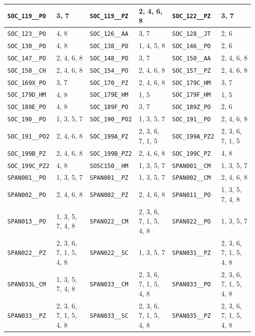 \begin{longtable}{|l|l||l|l||l|l|}
    \verb|SOC_119__PO| & 3, 7 & \verb|SOC_119__PZ| & 2, 4, 6, 8 & \verb|SOC_122__PZ| & 3, 7\\\hline
    \verb|SOC_123__PO| & 4, 8 & \verb|SOC_126__AA| & 3, 7 & \verb|SOC_128__JT| & 2, 6\\\hline
    \verb|SOC_130__PO| & 4, 8 & \verb|SOC_138__PO| & 1, 4, 5, 8 & \verb|SOC_146__PO| & 2, 6\\\hline
    \verb|SOC_147__PO| & 2, 4, 6, 8 & \verb|SOC_148__PO| & 3, 7 & \verb|SOC_150__AA| & 2, 4, 6, 8\\\hline
    \verb|SOC_150__CH| & 2, 4, 6, 8 & \verb|SOC_154__PO| & 2, 4, 6, 8 & \verb|SOC_157__PZ| & 2, 4, 6, 8\\\hline
    \verb|SOC_169X_PO| & 3, 7 & \verb|SOC_170__PZ| & 2, 4, 6, 8 & \verb|SOC_179C_HM| & 3, 7\\\hline
    \verb|SOC_179D_HM| & 4, 8 & \verb|SOC_179E_HM| & 1, 5 & \verb|SOC_179F_HM| & 1, 5\\\hline
    \verb|SOC_189E_PO| & 4, 8 & \verb|SOC_189F_PO| & 3, 7 & \verb|SOC_189Z_PO| & 2, 6\\\hline
    \verb|SOC_190__PO| & 1, 3, 5, 7 & \verb|SOC_190__PO2| & 1, 3, 5, 7 & \verb|SOC_191__PO| & 2, 4, 6, 8\\\hline
    \verb|SOC_191__PO2| & 2, 4, 6, 8 & \verb|SOC_199A_PZ| & 2, 3, 6, 7, 1, 5 & \verb|SOC_199A_PZ2| & 2, 3, 6, 7, 1, 5\\\hline
    \verb|SOC_199B_PZ| & 2, 4, 6, 8 & \verb|SOC_199B_PZ2| & 2, 4, 6, 8 & \verb|SOC_199C_PZ| & 4, 8\\\hline
    \verb|SOC_199C_PZ2| & 4, 8 & \verb|SOSC150__HM| & 1, 3, 5, 7 & \verb|SPAN001__CM| & 1, 3, 5, 7\\\hline
    \verb|SPAN001__PO| & 1, 3, 5, 7 & \verb|SPAN001__PZ| & 1, 3, 5, 7 & \verb|SPAN002__CM| & 2, 4, 6, 8\\\hline
    \verb|SPAN002__PO| & 2, 4, 6, 8 & \verb|SPAN002__PZ| & 2, 4, 6, 8 & \verb|SPAN011__PO| & 1, 3, 5, 7, 4, 8\\\hline
    \verb|SPAN013__PO| & 1, 3, 5, 7, 4, 8 & \verb|SPAN022__CM| & 2, 3, 6, 7, 1, 5, 4, 8 & \verb|SPAN022__PO| & 1, 3, 5, 7\\\hline
    \verb|SPAN022__PZ| & 2, 3, 6, 7, 1, 5, 4, 8 & \verb|SPAN022__SC| & 1, 3, 5, 7 & \verb|SPAN031__PZ| & 2, 3, 6, 7, 1, 5, 4, 8\\\hline
    \verb|SPAN033L_CM| & 1, 3, 5, 7, 4, 8 & \verb|SPAN033__CM| & 2, 3, 6, 7, 1, 5, 4, 8 & \verb|SPAN033__PO| & 2, 3, 6, 7, 1, 5, 4, 8\\\hline
    \verb|SPAN033__PZ| & 2, 3, 6, 7, 1, 5, 4, 8 & \verb|SPAN033__SC| & 2, 3, 6, 7, 1, 5, 4, 8 & \verb|SPAN035__PZ| & 2, 3, 6, 7, 1, 5, 4, 8\\\hline

\end{longtable}
